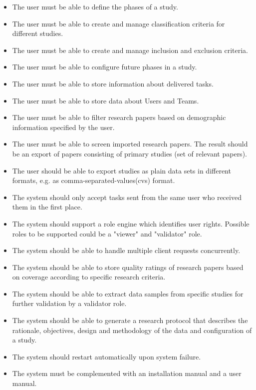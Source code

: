 \begin{itemize}
\item The user must be able to define the phases of a study. 
\item The user must be able to create and manage classification criteria for different studies.
\item The user must be able to create and manage inclusion and exclusion criteria.
\item The user must be able to configure future phases in a study.
\item The user must be able to store information about delivered tasks.
\item The user must be able to store data about Users and Teams.
\item The user must be able to filter research papers based on demographic information specified by the user. 
\item The user must be able to screen imported research papers. The result should be an export of papers consisting of primary studies (set of relevant papers). 
\item The user should be able to export studies as plain data sets in different formats, e.g. as comma-separated-values(cvs) format. 
\item The system should only accept tasks sent from the same user who received them in the first place. 
\item The system should support a role engine which identifies user rights. Possible roles to be supported could be a "viewer" and "validator" role. 
\item The system should be able to handle multiple client requests concurrently. 
\item The system should be able to store quality ratings of research papers based on coverage according to specific research criteria.
\item The system should be able to extract data samples from specific studies for further validation by a validator role.
\item The system should be able to generate a research protocol that describes the rationale, objectives, design and methodology of the data and configuration of a study. 
\item The system should restart automatically upon system failure.
\item The system must be complemented with an installation manual and a user manual.
\end{itemize}

